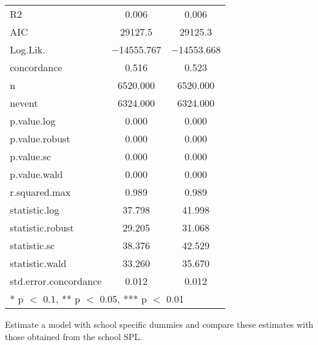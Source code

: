 \documentclass[
]{article}
\begin{document}
\begin{table}[!h]
\begin{tabular}[t]{lcc}
R2 & \num{0.006} & \num{0.006}\\
AIC & \num{29127.5} & \num{29125.3}\\
Log.Lik. & \num{-14555.767} & \num{-14553.668}\\
concordance & \num{0.516} & \num{0.523}\\
n & \num{6520.000} & \num{6520.000}\\
nevent & \num{6324.000} & \num{6324.000}\\
p.value.log & \num{0.000} & \num{0.000}\\
p.value.robust & \num{0.000} & \num{0.000}\\
p.value.sc & \num{0.000} & \num{0.000}\\
p.value.wald & \num{0.000} & \num{0.000}\\
r.squared.max & \num{0.989} & \num{0.989}\\
statistic.log & \num{37.798} & \num{41.998}\\
statistic.robust & \num{29.205} & \num{31.068}\\
statistic.sc & \num{38.376} & \num{42.529}\\
statistic.wald & \num{33.260} & \num{35.670}\\
std.error.concordance & \num{0.012} & \num{0.012}\\
\bottomrule
\multicolumn{3}{l}{\rule{0pt}{1em}* p $<$ 0.1, ** p $<$ 0.05, *** p $<$ 0.01}\\
\end{tabular}
\end{table}

Estimate a model with school specific dummies and compare these
estimates with those obtained from the school SPL.
\end{document}
